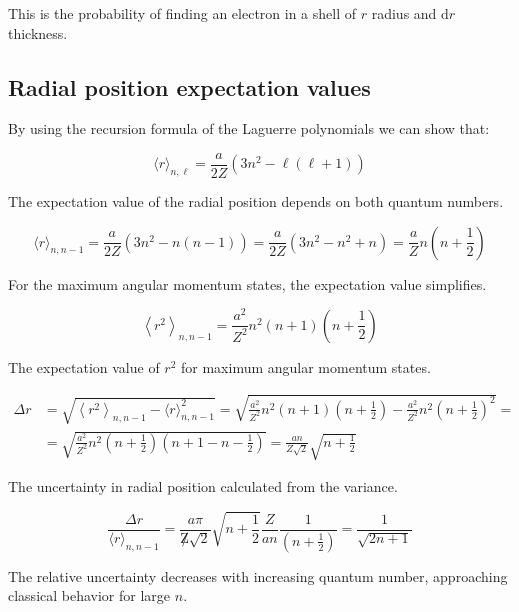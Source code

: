 \documentclass[italian]{HKNdocument}
\begin{document}
This is the probability of finding an electron in a shell of $r$ radius and $\mathrm{d} r$ thickness.

\subsection{Radial position expectation values}
By using the recursion formula of the Laguerre polynomials we can show that:

\begin{equation}
\langle r\rangle_{n, \ell}=\frac{a}{2 Z}\left(3 n^{2}-\ell(\ell+1)\right)
\end{equation}

The expectation value of the radial position depends on both quantum numbers.

\begin{equation}
\langle r\rangle_{n, n-1}=\frac{a}{2 Z}\left(3 n^{2}-n(n-1)\right)=\frac{a}{2 Z}\left(3 n^{2}-n^{2}+n\right)=\frac{a}{Z} n\left(n+\frac{1}{2}\right)
\end{equation}

For the maximum angular momentum states, the expectation value simplifies.

\begin{equation}
\left\langle r^{2}\right\rangle_{n, n-1}=\frac{a^{2}}{Z^{2}} n^{2}(n+1)\left(n+\frac{1}{2}\right)
\end{equation}

The expectation value of $r^2$ for maximum angular momentum states.

\begin{align}
\Delta r & =\sqrt{\left\langle r^{2}\right\rangle_{n, n-1}-\langle r\rangle_{n, n-1}^{2}}=\sqrt{\frac{a^{2}}{Z^{2}} n^{2}(n+1)\left(n+\frac{1}{2}\right)-\frac{a^{2}}{Z^{2}} n^{2}\left(n+\frac{1}{2}\right)^{2}}= \\
& =\sqrt{\frac{a^{2}}{Z^{2}} n^{2}\left(n+\frac{1}{2}\right)\left(n+1-n-\frac{1}{2}\right)}=\frac{a n}{Z \sqrt{2}} \sqrt{n+\frac{1}{2}}
\end{align}

The uncertainty in radial position calculated from the variance.

\begin{equation}
\frac{\Delta r}{\langle r\rangle_{n, n-1}}=\frac{a \pi}{\not Z \sqrt{2}} \sqrt{n+\frac{1}{2}} \frac{Z}{a n} \frac{1}{\left(n+\frac{1}{2}\right)}=\frac{1}{\sqrt{2 n+1}}
\end{equation}

The relative uncertainty decreases with increasing quantum number, approaching classical behavior for large $n$.
\end{document}
